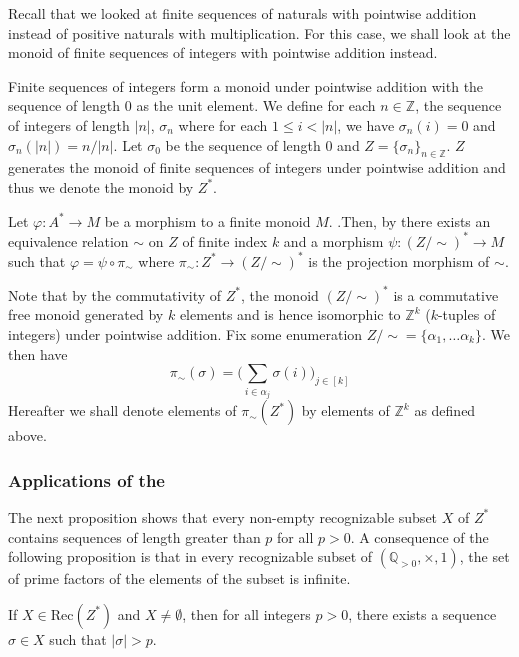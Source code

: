 \documentclass{llncs}
\begin{document}
Recall that we looked at finite sequences of naturals with pointwise addition instead of positive naturals with multiplication. For this case, we shall look at the monoid of finite sequences of integers with pointwise addition instead.

Finite sequences of integers form a monoid under pointwise addition with the sequence of length 0 as the unit element. We define for each $n \in \mathbb{Z}$, the sequence of integers of length $|n|$, $\sigma_n$ where for each $1 \le i < |n|$, we have $\sigma_n(i) = 0$ and $\sigma_{n}(|n|) = n/|n|$. Let $\sigma_0$ be the sequence of length 0 and $Z = \{\sigma_n\}_{n \in \mathbb{Z}}$. $Z$ generates the monoid of finite sequences of integers under pointwise addition and thus we denote the monoid by $Z^*$.

Let $\varphi: A^* \to M$ be a morphism to a finite monoid $M$. .Then, by  there exists an equivalence relation $\sim$ on $Z$ of finite index $k$ and a morphism $\psi: (Z/\sim)^* \to M$ such that $\varphi = \psi \circ \pi_\sim$ where $\pi_\sim: Z^* \to (Z/\sim)^*$ is the projection morphism of $\sim$. 

Note that by the commutativity of $Z^*$, the monoid $(Z/\sim)^*$ is a commutative free monoid generated by $k$ elements and is hence isomorphic to $\mathbb{Z}^k$ ($k$-tuples of integers) under pointwise addition. Fix some enumeration $Z/\sim = \{\alpha_1, \dots \alpha_k\}$. We then have
\begin{equation*}
  \pi_\sim(\sigma) = \Big(\sum\limits_{i \in \alpha_j} \sigma(i)\Big)_{j \in [k]}
\end{equation*}
Hereafter we shall denote elements of $\pi_\sim(Z^*)$ by elements of $\mathbb{Z}^k$ as defined above.

\subsubsection{Applications of the }

The next proposition shows that every non-empty recognizable subset $X$ of $Z^*$ contains sequences of length greater than $p$ for all $p > 0$.
A consequence of the following proposition is that in every recognizable subset of $(\mathbb{Q}_{>0}, \times, 1)$, the set of prime factors of the elements of the subset is infinite.
\begin{proposition}
  If $X \in \text{Rec}(Z^*)$ and $X \neq \emptyset$, then for all integers $p > 0$, there exists a sequence $\sigma \in X$ such that $|\sigma| > p$.
  \label{prop:Rec-Z*-sequence-lenth-unbounded}
\end{proposition}
\end{document}
